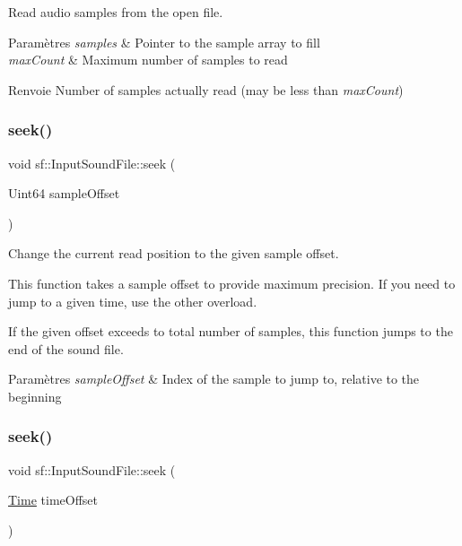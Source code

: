 Read audio samples from the open file. 


\begin{DoxyParams}{Paramètres}
{\em samples} & Pointer to the sample array to fill \\
\hline
{\em max\+Count} & Maximum number of samples to read\\
\hline
\end{DoxyParams}
\begin{DoxyReturn}{Renvoie}
Number of samples actually read (may be less than {\itshape max\+Count}) 
\end{DoxyReturn}
\mbox{\label{classsf_1_1InputSoundFile_aaf97be15020a42e159ff88f76f22af20}} 
\subsubsection{\texorpdfstring{seek()}{seek()}\hspace{0.1cm}{\footnotesize\ttfamily [1/2]}}
{\footnotesize\ttfamily void sf\+::\+Input\+Sound\+File\+::seek (\begin{DoxyParamCaption}\item[{Uint64}]{sample\+Offset }\end{DoxyParamCaption})}



Change the current read position to the given sample offset. 

This function takes a sample offset to provide maximum precision. If you need to jump to a given time, use the other overload.

If the given offset exceeds to total number of samples, this function jumps to the end of the sound file.


\begin{DoxyParams}{Paramètres}
{\em sample\+Offset} & Index of the sample to jump to, relative to the beginning \\
\hline
\end{DoxyParams}
\mbox{\label{classsf_1_1InputSoundFile_a8eee7af58ad75ddc61f93ad72e2d66c1}} 
\subsubsection{\texorpdfstring{seek()}{seek()}\hspace{0.1cm}{\footnotesize\ttfamily [2/2]}}
{\footnotesize\ttfamily void sf\+::\+Input\+Sound\+File\+::seek (\begin{DoxyParamCaption}\item[{\hyperlink{classsf_1_1Time}{Time}}]{time\+Offset }\end{DoxyParamCaption})}



